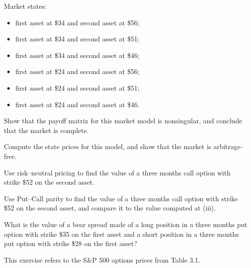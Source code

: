 \begin{exercises}
\noindent Market states:
\begin{itemize}
\item first asset at \$34 and second asset at \$56;
\item first asset at \$34 and second asset at \$51;
\item first asset at \$34 and second asset at \$46;
\item first asset at \$24 and second asset at \$56;
\item first asset at \$24 and second asset at \$51;
\item first asset at \$24 and second asset at \$46.
\end{itemize}
\begin{subparts}
\item Show that the payoff matrix for this market model is nonsingular,
and conclude that the market is complete.
\item Compute the state prices for this model, and show that the market
is arbitrage--free.
\item Use risk--neutral pricing to find the value of a three months call
option with strike \$52 on the second asset.
\item Use Put--Call parity to find the value of a three months call
option with strike \$52 on the second asset, and compare it to the value
computed at (iii).
\item What is the value of a bear spread made of a long position in a
three months put option with strike \$35 on the first asset and a short
position in a three months put option with strike \$28 on the first
asset?
\end{subparts}

\item This exercise refers to the S\&P 500 options prices from Table 3.1.


\end{exercises}
